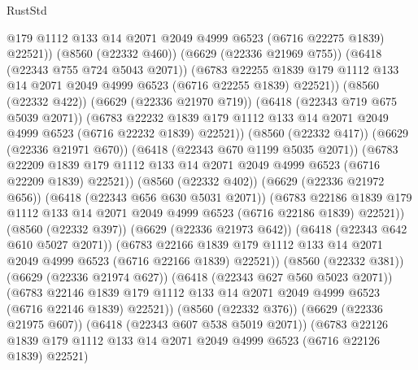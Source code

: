 \begin{lexlean}{RustStd}
\begin{coremodule}
                    @179
                    @1112
                    @133
                    @14
                    @2071
                    @2049
                    @4999
                    @6523
                    (@6716 @22275 @1839)
                    @22521))
                (@8560 (@22332 @460))
                (@6629 (@22336 @21969 @755))
                (@6418 (@22343 @755 @724 @5043 @2071))
                (@6783
                  @22255
                  @1839
                  @179
                  @1112
                  @133
                  @14
                  @2071
                  @2049
                  @4999
                  @6523
                  (@6716 @22255 @1839)
                  @22521))
              (@8560 (@22332 @422))
              (@6629 (@22336 @21970 @719))
              (@6418 (@22343 @719 @675 @5039 @2071))
              (@6783
                @22232
                @1839
                @179
                @1112
                @133
                @14
                @2071
                @2049
                @4999
                @6523
                (@6716 @22232 @1839)
                @22521))
            (@8560 (@22332 @417))
            (@6629 (@22336 @21971 @670))
            (@6418 (@22343 @670 @1199 @5035 @2071))
            (@6783
              @22209
              @1839
              @179
              @1112
              @133
              @14
              @2071
              @2049
              @4999
              @6523
              (@6716 @22209 @1839)
              @22521))
          (@8560 (@22332 @402))
          (@6629 (@22336 @21972 @656))
          (@6418 (@22343 @656 @630 @5031 @2071))
          (@6783
            @22186
            @1839
            @179
            @1112
            @133
            @14
            @2071
            @2049
            @4999
            @6523
            (@6716 @22186 @1839)
            @22521))
        (@8560 (@22332 @397))
        (@6629 (@22336 @21973 @642))
        (@6418 (@22343 @642 @610 @5027 @2071))
        (@6783
          @22166
          @1839
          @179
          @1112
          @133
          @14
          @2071
          @2049
          @4999
          @6523
          (@6716 @22166 @1839)
          @22521))
      (@8560 (@22332 @381))
      (@6629 (@22336 @21974 @627))
      (@6418 (@22343 @627 @560 @5023 @2071))
      (@6783 @22146 @1839 @179 @1112 @133 @14 @2071 @2049 @4999 @6523 (@6716 @22146 @1839) @22521))
    (@8560 (@22332 @376))
    (@6629 (@22336 @21975 @607))
    (@6418 (@22343 @607 @538 @5019 @2071))
    (@6783 @22126 @1839 @179 @1112 @133 @14 @2071 @2049 @4999 @6523 (@6716 @22126 @1839) @22521)

\end{coremodule}
\end{lexlean}
